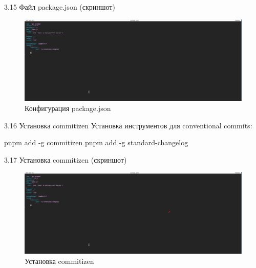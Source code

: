 \documentclass[
  ignorenonframetext,
  aspectratio=169,
  russian,
]{beamer}
\newenvironment{Shaded}{\begin{snugshade}}{\end{snugshade}}
\newcommand{\AttributeTok}[1]{\textcolor[rgb]{0.40,0.45,0.13}{#1}}
\newcommand{\ExtensionTok}[1]{\textcolor[rgb]{0.00,0.23,0.31}{#1}}
\newcommand{\NormalTok}[1]{\textcolor[rgb]{0.00,0.23,0.31}{#1}}
\begin{document}
\begin{frame}{3.15 Файл package.json (скриншот)}
\label{ux444ux430ux439ux43b-package.json-ux441ux43aux440ux438ux43dux448ux43eux442}
\begin{figure}[H]

{\centering \includegraphics[width=0.8\linewidth,height=\textheight,keepaspectratio]{image/package.json.png}

}

\caption{Конфигурация package.json}

\end{figure}%
\end{frame}

\begin{frame}[fragile]{3.16 Установка commitizen}
\label{ux443ux441ux442ux430ux43dux43eux432ux43aux430-commitizen}
Установка инструментов для conventional commits:

\begin{Shaded}
\begin{Highlighting}[]
\ExtensionTok{pnpm}\NormalTok{ add }\AttributeTok{{-}g}\NormalTok{ commitizen}
\ExtensionTok{pnpm}\NormalTok{ add }\AttributeTok{{-}g}\NormalTok{ standard{-}changelog}
\end{Highlighting}
\end{Shaded}
\end{frame}

\begin{frame}{3.17 Установка commitizen (скриншот)}
\label{ux443ux441ux442ux430ux43dux43eux432ux43aux430-commitizen-ux441ux43aux440ux438ux43dux448ux43eux442}
\begin{figure}[H]

{\centering \includegraphics[width=0.8\linewidth,height=\textheight,keepaspectratio]{image/commitzen.png}

}

\caption{Установка commitizen}

\end{figure}%
\end{frame}
\end{document}
